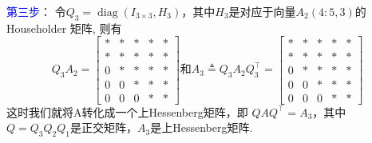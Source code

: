 \documentclass[12pt,a4paper]{article}
\begin{document}
\textcolor{blue}{第三步}：
令$Q_{3}=\operatorname{diag}\left(I_{3 \times 3}, H_{3}\right)$，其中$H_{3}$是对应于向量$A_{2}(4 : 5,3)$的Householder 矩阵, 则有
$$
Q_{3} A_{2}=\left[\begin{array}{ccccc}
* &*& *& *&* \\ 
* &*& *& *&* \\ 
0 &*& *& *&*\\ 
0 &0& *& *&*\\ 
0 &0& 0& *&*
\end{array}\right]和A_{3} \triangleq Q_{3} A_{2} Q_{3}^{\top}=\left[\begin{array}{ccccc}
* &*& *& *&* \\ 
* &*& *& *&* \\ 
0 &*& *& *&*\\ 
0 &0& *& *&*\\ 
0 &0& 0& *&*
\end{array}\right]
$$
这时我们就将A转化成一个上Hessenberg矩阵，即
$Q A Q^{\top}=A_{3}$，其中$Q=Q_{3} Q_{2} Q_{1}$是正交矩阵，$A_{3}$是上Hessenberg矩阵.
\end{document}

